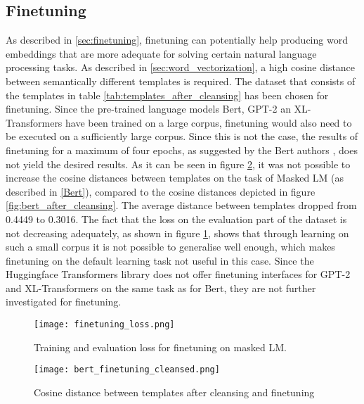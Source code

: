 \subsection{Finetuning}
As described in \ref{sec:finetuning}, finetuning can potentially help producing word embeddings that are more adequate for solving certain natural language processing tasks. As described in \ref{sec:word_vectorization}, a high cosine distance between semantically different templates is required. The dataset that consists of the templates in table \ref{tab:templates_after_cleansing} has been chosen for finetuning. Since the pre-trained language models Bert, GPT-2 an XL-Transformers have been trained on a large corpus, finetuning would also need to be executed on a sufficiently large corpus. Since this is not the case, the results of finetuning for a maximum of four epochs, as suggested by the Bert authors \cite{devlin2018bert}, does not yield the desired results. As it can be seen in figure \ref{fig:cos_distance_finetuning}, it was not possible to increase the cosine distances between templates on the task of Masked LM (as described in \ref{Bert}), compared to the cosine distances depicted in figure \ref{fig:bert_after_cleansing}. The average distance between templates dropped from 0.4449 to 0.3016. The fact that the loss on the evaluation part of the dataset is not decreasing adequately, as shown in figure \ref{fig:finetuning_loss}, shows that through learning on such a small corpus it is not possible to generalise well enough, which makes finetuning on the default learning task not useful in this case. Since the Huggingface Transformers library does not offer finetuning interfaces for GPT-2 and XL-Transformers on the same task as for Bert, they are not further investigated for finetuning.

\begin{figure}[H]
  \centering
  \texttt{[image: finetuning\_loss.png]}\\
  \caption{Training and evaluation loss for finetuning on masked LM.}
  \label{fig:finetuning_loss}
\end{figure}

\clearpage
\begin{figure}[h]
  \centering
  \texttt{[image: bert\_finetuning\_cleansed.png]}\\
  \caption{Cosine distance between templates after cleansing and finetuning}
  \label{fig:cos_distance_finetuning}
\end{figure}


